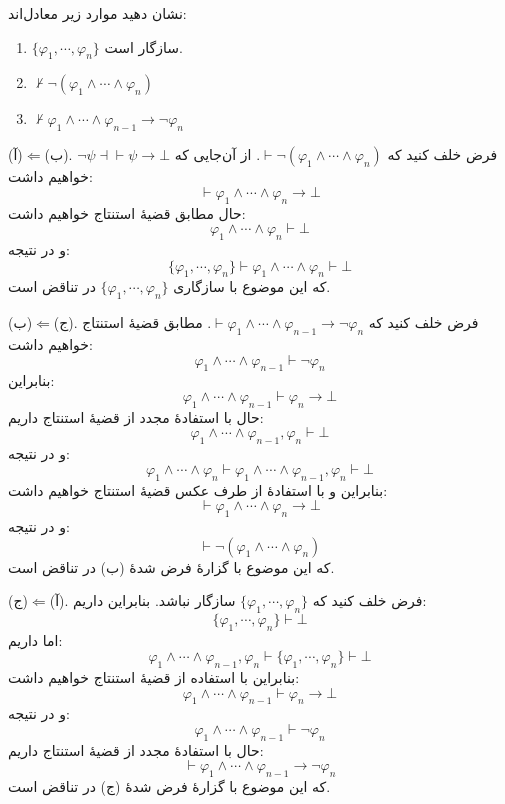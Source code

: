 نشان دهید موارد زیر معادل‌اند:
\begin{enumerate}[label=(\alph*)]
    \item
    $\{\varphi_1,\cdots,\varphi_n\}$
    سازگار است.
    \item $\not\vdash\neg(\varphi_1\wedge\cdots\wedge\varphi_n)$
    \item $\not\vdash\varphi_1\wedge\cdots\wedge\varphi_{n-1}\to\neg\varphi_n$
\end{enumerate}
\begin{ans}
(آ)$\Leftarrow$(ب). فرض خلف کنید که $\vdash\neg(\varphi_1\wedge\cdots\wedge\varphi_n)$. از آن‌جایی که $\neg\psi \dashv\vdash \psi \to \bot$ خواهیم داشت:
$$\vdash \varphi_1\wedge\cdots\wedge\varphi_n \to \bot$$
حال مطابق قضیهٔ استنتاج خواهیم داشت:
$$\varphi_1\wedge\cdots\wedge\varphi_n \vdash \bot$$
و در نتیجه:
$$\{\varphi_1,\cdots,\varphi_n\} \vdash \varphi_1\wedge\cdots\wedge\varphi_n \vdash \bot$$
که این موضوع با سازگاری $\{\varphi_1,\cdots,\varphi_n\}$ در تناقض است.

(ب)$\Leftarrow$(ج). فرض خلف کنید که $\vdash\varphi_1\wedge\cdots\wedge\varphi_{n-1}\to\neg\varphi_n$. مطابق قضیهٔ استنتاج خواهیم داشت:
$$\varphi_1\wedge\cdots\wedge\varphi_{n-1} \vdash \neg\varphi_n$$
بنابراین:
$$\varphi_1\wedge\cdots\wedge\varphi_{n-1} \vdash \varphi_n\to\bot$$
حال با استفادهٔ مجدد از قضیهٔ استنتاج داریم:
$$\varphi_1\wedge\cdots\wedge\varphi_{n-1},\varphi_n \vdash \bot$$
و در نتیجه:
$$\varphi_1\wedge\cdots\wedge\varphi_n \vdash \varphi_1\wedge\cdots\wedge\varphi_{n-1},\varphi_n \vdash \bot$$
بنابراین و با استفادهٔ از طرف عکس قضیهٔ استنتاج خواهیم داشت:
$$\vdash \varphi_1\wedge\cdots\wedge\varphi_n\to\bot$$
و در نتیجه:
$$\vdash \neg(\varphi_1\wedge\cdots\wedge\varphi_n)$$
که این موضوع با گزارهٔ فرض شدهٔ (ب) در تناقض است.

(ج)$\Leftarrow$(آ). فرض خلف کنید که $\{\varphi_1,\cdots,\varphi_n\}$ سازگار نباشد. بنابراین داریم:
$$\{\varphi_1,\cdots,\varphi_n\}\vdash\bot$$
اما داریم:
$$\varphi_1\wedge\cdots\wedge\varphi_{n-1},\varphi_n\vdash\{\varphi_1,\cdots,\varphi_n\}\vdash\bot$$
بنابراین با استفاده از قضیهٔ استنتاج خواهیم داشت:
$$\varphi_1\wedge\cdots\wedge\varphi_{n-1}\vdash\varphi_n\to\bot$$
و در نتیجه:
$$\varphi_1\wedge\cdots\wedge\varphi_{n-1}\vdash\neg\varphi_n$$
حال با استفادهٔ مجدد از قضیهٔ استنتاج داریم:
$$\vdash\varphi_1\wedge\cdots\wedge\varphi_{n-1}\to\neg\varphi_n$$
که این موضوع با گزارهٔ فرض شدهٔ (ج) در تناقض است.
\end{ans}
